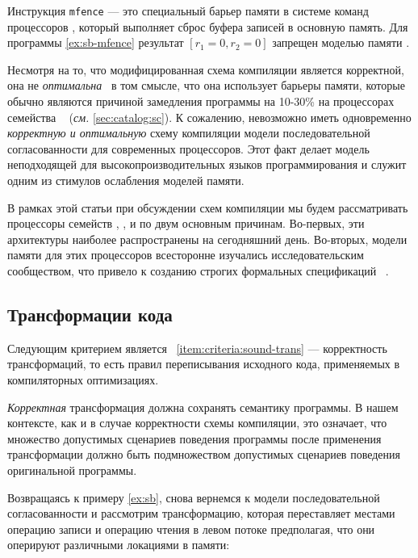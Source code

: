 Инструкция \texttt{mfence} --- это специальный барьер памяти в системе команд процессоров 
\Intel, который выполняет сброс буфера записей в основную память. 
Для программы \ref{ex:sb-mfence} результат ${[r_1=0, r_2=0]}$
запрещен моделью памяти \Intel. 

Несмотря на то, что модифицированная схема компиляции является корректной, 
она не \emph{оптимальна}~\cite{OptimalCompilationCPP}
в том смысле, что она использует барьеры памяти,
которые обычно являются причиной замедления программы 
на 10-30\% на процессорах семейства \Intel~\cite{Marino-al:PLDI11, Liu-al:OOPSLA17}
(\emph{см.} \cref{sec:catalog:sc}).
К сожалению, невозможно иметь одновременно \emph{корректную и оптимальную} 
схему компиляции модели последовательной согласованности 
для современных процессоров. 
Этот факт делает модель \SC неподходящей 
для высокопроизводительных языков программирования 
и служит одним из стимулов ослабления моделей памяти. 

В рамках этой статьи при обсуждении 
схем компиляции мы будем рассматривать процессоры семейств
\Intel, ,  и \POWER 
по двум основным причинам. 
Во-первых, эти архитектуры наиболее 
распространены на сегодняшний день. 
Во-вторых, модели памяти для этих процессоров 
всесторонне изучались исследовательским сообществом, 
что привело к созданию строгих 
формальных спецификаций~%
\cite{Sewell-al:CACM10, Sarkar-al:PLDI11, 
Flur-al:POPL16, Pulte-al:POPL18}. 

\subsection{Трансформации кода}
\label{sec:background:trans}

Следующим критерием является ~\ref{item:criteria:sound-trans} ---
корректность трансформаций, то есть правил переписывания 
исходного кода, применяемых в компиляторных оптимизациях. 

\emph{Корректная} трансформация должна сохранять семантику программы. 
В нашем контексте, как и в случае корректности схемы компиляции,
это означает, что множество допустимых сценариев поведения 
программы после применения трансформации должно 
быть подмножеством допустимых сценариев поведения оригинальной программы.

Возвращаясь к примеру \ref{ex:sb},
снова вернемся к модели последовательной согласованности 
и рассмотрим трансформацию, которая переставляет местами 
операцию записи и операцию чтения в левом потоке предполагая, 
что они оперируют различными локациями в памяти:

